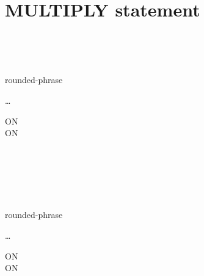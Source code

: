 \section{MULTIPLY statement}

\begin{1=}
  \identifier \\
  \literal
\end{1=}
\begin{1=}
  \begin{1=}
    \identifier \\
    \literal
  \end{1=}
  \begin{0-1}
    rounded-phrase
  \end{0-1}
\end{1=} \ldots

\begin{0+}
  ON   \imperativestatement \\
   ON   \imperativestatement
\end{0+}

\begin{0-1}
\end{0-1}

\begin{1=}
  \identifier \\
  \literal
\end{1=}
\begin{1=}
  \identifier \\
  \literal
\end{1=}

\begin{1=}
  \begin{1=}
    \identifier \\
    \literal
  \end{1=}
  \begin{0-1}
    rounded-phrase
  \end{0-1}
\end{1=} \ldots

\begin{0+}
  ON   \imperativestatement \\
   ON   \imperativestatement
\end{0+}

\begin{0-1}
\end{0-1}


